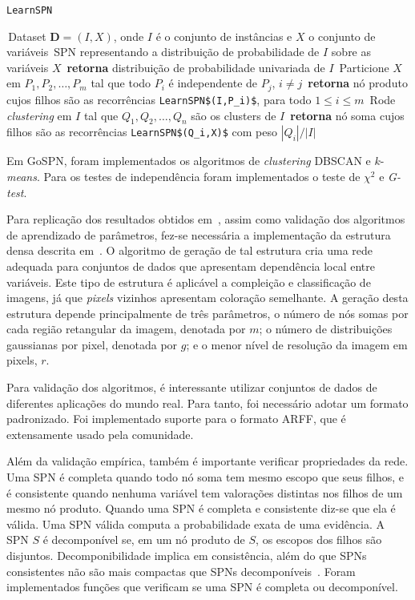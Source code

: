 \documentclass[12pt]{article}
\theoremstyle{plain}
\numberwithin{equation}{section}
\newcommand{\code}[1]{\lstinline[mathescape=true]{#1}}
\newcommand{\mcode}[1]{\lstinline[mathescape]!#1!}
\begin{document}
\begin{algorithm}[H]
  \caption*{\code{LearnSPN}~\cite{gens-domingos}}
  \begin{algorithmic}[1]
    \Require\,Dataset $\mathbf{D}=(I,X)$, onde $I$ é o conjunto de instâncias e $X$ o conjunto de
    variáveis
    \Ensure\,SPN representando a distribuição de probabilidade de $I$ sobre as variáveis $X$
      \State\,\textbf{retorna} distribuição de probabilidade univariada de $I$
    \Else%
      \State\,Particione $X$ em $P_1,P_2,\ldots,P_m$ tal que todo $P_i$ é independente de $P_j$,
      $i\neq j$
        \State\,\textbf{retorna} nó produto cujos filhos são as recorrências
        \mcode{LearnSPN$(I,P_i)$}, para todo $1\leq i\leq m$
      \Else%
        \State\,Rode \textit{clustering} em $I$ tal que $Q_1,Q_2,\ldots,Q_n$ são os clusters de $I$
        \State\,\textbf{retorna} nó soma cujos filhos são as recorrências \mcode{LearnSPN$(Q_i,X)$}
        com peso $|Q_i|/|I|$
      \EndIf%
    \EndIf%
  \end{algorithmic}
\end{algorithm}

Em GoSPN, foram implementados os algoritmos de \textit{clustering} DBSCAN e $k$-\textit{means}.
Para os testes de independência foram implementados o teste de $\chi^2$ e \textit{G-test}.

Para replicação dos resultados obtidos em~\cite{poon-domingos}, assim como validação dos algoritmos
de aprendizado de parâmetros, fez-se necessária a implementação da estrutura densa descrita
em~\cite{poon-domingos}. O algoritmo de geração de tal estrutura cria uma rede adequada para
conjuntos de dados que apresentam dependência local entre variáveis. Este tipo de estrutura é
aplicável a compleição e classificação de imagens, já que \textit{pixels} vizinhos apresentam
coloração semelhante. A geração desta estrutura depende principalmente de três parâmetros, o número
de nós somas por cada região retangular da imagem, denotada por $m$; o número de distribuições
gaussianas por pixel, denotada por $g$; e o menor nível de resolução da imagem em pixels, $r$.

Para validação dos algoritmos, é interessante utilizar conjuntos de dados de diferentes aplicações
do mundo real. Para tanto, foi necessário adotar um formato padronizado. Foi implementado suporte
para o formato ARFF, que é extensamente usado pela comunidade.

Além da validação empírica, também é importante verificar propriedades da rede. Uma SPN é completa
quando todo nó soma tem mesmo escopo que seus filhos, e é consistente quando nenhuma variável tem
valorações distintas nos filhos de um mesmo nó produto. Quando uma SPN é completa e consistente
diz-se que ela é válida. Uma SPN válida computa a probabilidade exata de uma evidência. A SPN $S$ é
decomponível se, em um nó produto de $S$, os escopos dos filhos são disjuntos. Decomponibilidade
implica em consistência, além do que SPNs consistentes não são mais compactas que SPNs
decomponíveis~\cite{theoretical-spn}. Foram implementados funções que verificam se uma SPN é
completa ou decomponível.
\end{document}
